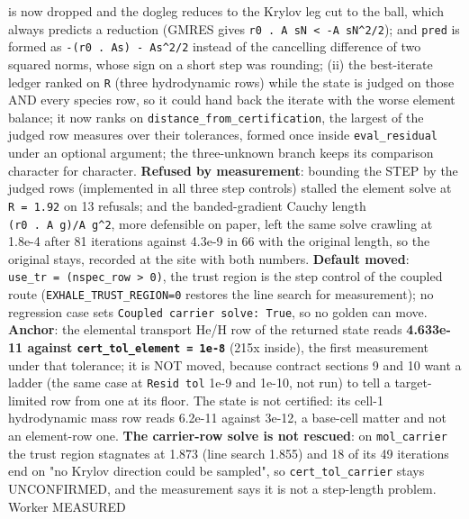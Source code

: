 \documentclass[english,a4paper]{my_memo}
\begin{document}
\begin{itemize}
  is now dropped and the dogleg reduces to the Krylov leg cut to the ball,
  which always predicts a reduction (GMRES gives \texttt{r0\ .\ A\ sN\ \textless{}\ -\textbar{}\textbar{}A\ sN\textbar{}\textbar{}\^{}2/2});
  and \texttt{pred} is formed as \texttt{-(r0\ .\ As)\ -\ \textbar{}\textbar{}As\textbar{}\textbar{}\^{}2/2} instead of the
  cancelling difference of two squared norms, whose sign on a short step was
  rounding; (ii) the best-iterate ledger ranked on \texttt{\textbar{}\textbar{}R\textbar{}\textbar{}} (three
  hydrodynamic rows) while the state is judged on those AND every species
  row, so it could hand back the iterate with the worse element balance; it
  now ranks on \texttt{distance\_from\_certification}, the largest of the judged row
  measures over their tolerances, formed once inside \texttt{eval\_residual} under
  an optional argument; the three-unknown branch keeps its comparison
  character for character. \textbf{Refused by measurement}: bounding the STEP by
  the judged rows (implemented in all three step controls) stalled the
  element solve at \texttt{\textbar{}\textbar{}R\textbar{}\textbar{}\ =\ 1.92} on 13 refusals; and the banded-gradient
  Cauchy length \texttt{(r0\ .\ A\ g)/\textbar{}\textbar{}A\ g\textbar{}\textbar{}\^{}2}, more defensible on paper, left the
  same solve crawling at 1.8e-4 after 81 iterations against 4.3e-9 in 66
  with the original length, so the original stays, recorded at the site with
  both numbers. \textbf{Default moved}: \texttt{use\_tr\ =\ (nspec\_row\ \textgreater{}\ 0)}, the trust
  region is the step control of the coupled route (\texttt{EXHALE\_TRUST\_REGION=0}
  restores the line search for measurement); no regression case sets
  \texttt{Coupled\ carrier\ solve:\ True}, so no golden can move. \textbf{Anchor}: the
  elemental transport He/H row of the returned state reads \textbf{4.633e-11
  against \texttt{cert\_tol\_element\ =\ 1e-8}} (215x inside), the first measurement
  under that tolerance; it is NOT moved, because contract sections 9 and 10
  want a ladder (the same case at \texttt{Resid\ tol} 1e-9 and 1e-10, not run) to
  tell a target-limited row from one at its floor. The state is not
  certified: its cell-1 hydrodynamic mass row reads 6.2e-11 against 3e-12, a
  base-cell matter and not an element-row one. \textbf{The carrier-row solve is not
  rescued}: on \texttt{mol\_carrier} the trust region stagnates at 1.873 (line
  search 1.855) and 18 of its 49 iterations end on "no Krylov direction
  could be sampled", so \texttt{cert\_tol\_carrier} stays UNCONFIRMED, and the
  measurement says it is not a step-length problem. Worker MEASURED

\end{itemize}
\end{document}

